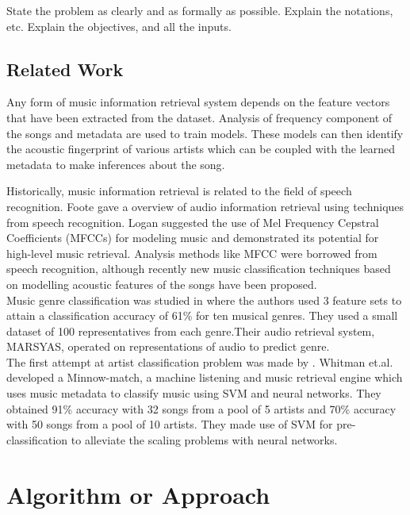 \documentclass[twocolumn]{article}
\newcommand{\comment}[1]{}
\begin{document}
State the problem as clearly and as formally as possible.
Explain the notations, etc.
Explain the objectives, and all the inputs.

\subsection{Related Work}

Any form of music information retrieval system depends on the feature vectors that have been extracted from the dataset. Analysis of frequency component of the songs and metadata are used to train models. These models can then identify the acoustic fingerprint of various artists which can be coupled with the learned metadata to make inferences about the song.

Historically, music information retrieval is related to the field of speech recognition. Foote \cite{Foote} gave a overview of audio information retrieval using techniques from speech recognition. Logan \cite{LOGAN} suggested the use of Mel Frequency Cepstral Coefficients (MFCCs) for modeling music and demonstrated its potential for high-level music retrieval. Analysis methods like MFCC were borrowed from speech recognition, although recently new music classification techniques based on modelling acoustic features of the songs have been proposed.\\
Music genre classification was studied in \cite{GTAN} where the authors used 3 feature sets to attain a classification accuracy of 61\% for ten musical genres. They used a small dataset of 100 representatives from each genre.Their audio retrieval system, MARSYAS, operated on representations of audio to predict genre.\\
The first attempt at artist classification problem was made by \cite{BGS}. Whitman et.al.\cite{BGS} developed a Minnow-match, a machine listening and music retrieval engine which uses music metadata to classify music using SVM and neural networks. They obtained 91\% accuracy with 32 songs from a pool of 5 artists and 70\% accuracy with 50 songs from a pool of 10 artists. They made use of SVM for pre-classification to alleviate the scaling problems with neural networks.
\comment{

Can also comment out paragraphs, etc.

}

\section{Algorithm or Approach}
\end{document}
